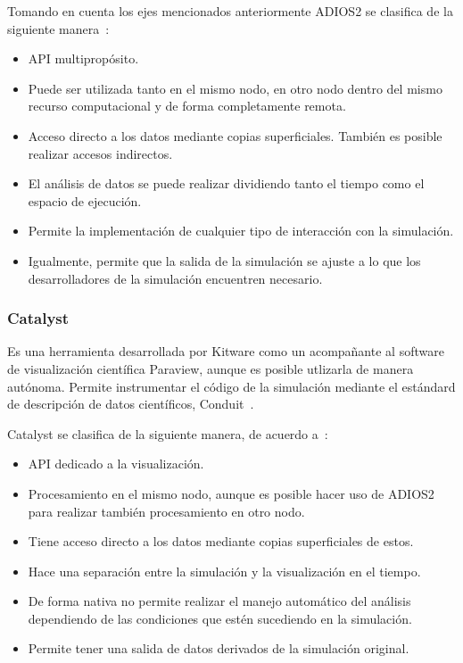 Tomando en cuenta los ejes mencionados anteriormente ADIOS2 se clasifica de la siguiente manera~\cite{childs_terminology_2020}: 
\begin{itemize}
    \item API multipropósito.
    \item Puede ser utilizada tanto en el mismo nodo, en otro nodo dentro del mismo recurso computacional y de forma completamente remota.
    \item Acceso directo a los datos mediante copias superficiales. También es posible realizar accesos indirectos.
    \item El análisis de datos se puede realizar dividiendo tanto el tiempo como el espacio de ejecución.
    \item Permite la implementación de cualquier tipo de interacción con la simulación.
    \item Igualmente, permite que la salida de la simulación se ajuste a lo que los desarrolladores de la simulación encuentren necesario.
\end{itemize}

\subsubsection{Catalyst}
Es una herramienta desarrollada por Kitware como un acompañante al software de visualización científica Paraview, aunque es posible utlizarla de manera autónoma. Permite instrumentar el código de la simulación mediante el estándard de descripción de datos científicos, Conduit~\cite{Ayachit2021}.

Catalyst se clasifica de la siguiente manera, de acuerdo a~\cite{childs_terminology_2020}:
\begin{itemize}
    \item API dedicado a la visualización.
    \item Procesamiento en el mismo nodo, aunque es posible hacer uso de ADIOS2 para realizar también procesamiento en otro nodo.
    \item Tiene acceso directo a los datos mediante copias superficiales de estos.
    \item Hace una separación entre la simulación y la visualización en el tiempo.
    \item De forma nativa no permite realizar el manejo automático del análisis dependiendo de las condiciones que estén sucediendo en la simulación.
    \item Permite tener una salida de datos derivados de la simulación original.
\end{itemize}

